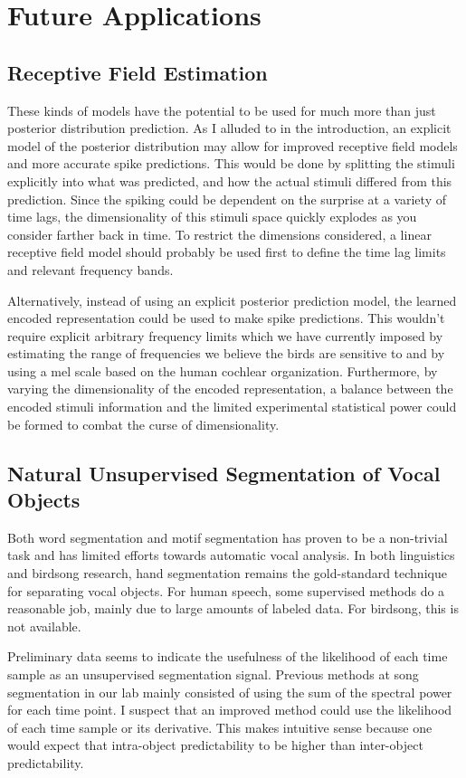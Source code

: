 \section{Future Applications}

\subsection{Receptive Field Estimation}
These kinds of models have the potential to be used for much more than just posterior distribution prediction. As I alluded to in the introduction, an explicit model of the posterior distribution may allow for improved receptive field models and more accurate spike predictions. This would be done by splitting the stimuli explicitly into what was predicted, and how the actual stimuli differed from this prediction. Since the spiking could be dependent on the surprise at a variety of time lags, the dimensionality of this stimuli space quickly explodes as you consider farther back in time. To restrict the dimensions considered, a linear receptive field model should probably be used first to define the time lag limits and relevant frequency bands.

Alternatively, instead of using an explicit posterior prediction model, the learned \CPC encoded representation could be used to make spike predictions. This wouldn't require explicit arbitrary frequency limits which we have currently imposed by estimating the range of frequencies we believe the birds are sensitive to and by using a mel scale based on the human cochlear organization. Furthermore, by varying the dimensionality of the \CPC encoded representation, a balance between the encoded stimuli information and the limited experimental statistical power could be formed to combat the curse of dimensionality.

\subsection{Natural Unsupervised Segmentation of Vocal Objects}
Both word segmentation and motif segmentation has proven to be a non-trivial task and has limited efforts towards automatic vocal analysis. In both linguistics and birdsong research, hand segmentation remains the gold-standard technique for separating vocal objects. For human speech, some supervised methods do a reasonable job, mainly due to large amounts of labeled data. For birdsong, this is not available.

Preliminary data seems to indicate the usefulness of the likelihood of each time sample as an unsupervised segmentation signal. Previous methods at song segmentation in our lab mainly consisted of using the sum of the spectral power for each time point. I suspect that an improved method could use the likelihood of each time sample or its derivative. This makes intuitive sense because one would expect that intra-object predictability to be higher than inter-object predictability.

